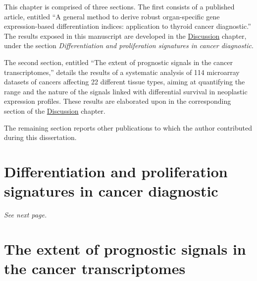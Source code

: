 This chapter is comprised of three sections.  The first consists of a published
article, entitled ``A general method to derive robust organ-specific gene
expression-based differentiation indices: application to thyroid cancer
diagnostic.''\cite{tomas_general_2012} The results exposed in this manuscript
are developed in the
\hyperref[discussion-differentiation-microarrays]{\textsf{Discussion}} chapter,
under the section \emph{Differentiation and proliferation signatures in cancer
  diagnostic}.

The second section, entitled ``The extent of prognostic signals in the cancer
transcriptomes,'' details the results of a systematic analysis of 114 microarray
datasets of cancers affecting 22 different tissue types, aiming at quantifying
the range and the nature of the signals linked with differential survival in
neoplastic expression profiles.  These results are elaborated upon in the
corresponding section of the
\hyperref[sec:discussion-prognostic-microarrays]{\textsf{Discussion}} chapter.

The remaining section reports other publications to which the author contributed
during this dissertation.



\section{Differentiation and proliferation signatures in cancer diagnostic}
\label{sec:results-differentiation-proliferation}

\emph{See next page.}

% 


\section{The extent of prognostic signals in the cancer transcriptomes}
\label{sec:results-prognostic-survival}

